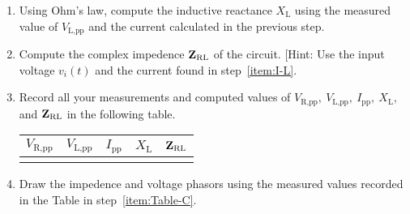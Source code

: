 \begin{enumerate}
  
\item Using Ohm's law, compute the inductive reactance $X_{\text{L}}$ using the measured value of $V_{\text{L,pp}}$ and the current calculated in the previous step.

  
\item Compute the complex impedence ${\bf Z}_{\text{RL}}$ of the circuit. [Hint: Use the input voltage $v_i(t)$ and the current found in step~\ref{item:I-L}.

\item Record all your measurements and computed values of $V_{\text{R,pp}},~V_{\text{L,pp}},~I_{\text{pp}},~X_{\text{L}},~$ and ${\bf Z}_{\text{RL}}$  in the following table. \label{item:Table-L}


    \begin{center}
    \begin{tabular}{|c|c|c|c|c|}
      \toprule
      $V_{\text{R,pp}}$ & $V_{\text{L,pp}}$ & $I_{\text{pp}}$ &  $X_{\text{L}}$ & ${\bf Z}_{\text{RL}}$\\
      \toprule
      &&&&\\
      \bottomrule
    \end{tabular}    
  \end{center}

  
   
\item Draw the impedence and voltage phasors using the measured values recorded in the Table in step~\ref{item:Table-C}.   


 \end{enumerate}


